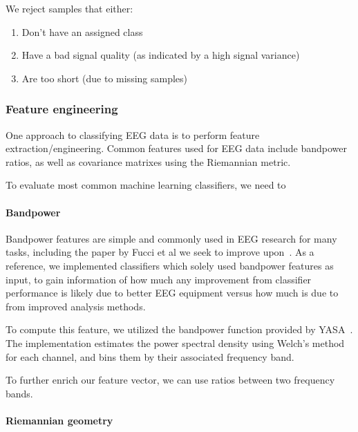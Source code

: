         We reject samples that either:

        \begin{enumerate}
            \item Don't have an assigned class
            \item Have a bad signal quality (as indicated by a high signal variance)
            \item Are too short (due to missing samples)
        \end{enumerate}


    \subsubsection{Feature engineering}

        One approach to classifying EEG data is to perform feature extraction/engineering. Common features used for EEG data include bandpower ratios, as well as covariance matrixes using the Riemannian metric.
        
        To evaluate most common machine learning classifiers, we need to 

        \paragraph{Bandpower}

            Bandpower features are simple and commonly used in EEG research for many tasks, including the paper by Fucci et al we seek to improve upon~\cite{fucci_replication_2019}. As a reference, we implemented classifiers which solely used bandpower features as input, to gain information of how much any improvement from classifier performance is likely due to better EEG equipment versus how much is due to from improved analysis methods.

            To compute this feature, we utilized the bandpower function provided by YASA~\cite{vallat_yasa_2020}. The implementation estimates the power spectral density using Welch's method for each channel, and bins them by their associated frequency band.

            To further enrich our feature vector, we can use ratios between two frequency bands.

        \paragraph{Riemannian geometry}

